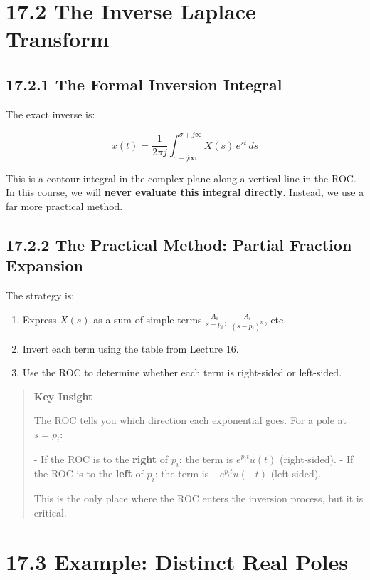 \documentclass[11pt]{article}
\begin{document}
\section*{17.2 The Inverse Laplace Transform}

\subsection*{17.2.1 The Formal Inversion Integral}

The exact inverse is:

\[x(t) = \frac{1}{2\pi j} \int_{\sigma-j\infty}^{\sigma+j\infty} X(s)\, e^{st}\, ds\]

This is a contour integral in the complex plane along a vertical line in the ROC. In this course, we will \textbf{never evaluate this integral directly}. Instead, we use a far more practical method.

\subsection*{17.2.2 The Practical Method: Partial Fraction Expansion}

The strategy is:

\begin{enumerate}
  \item Express $X(s)$ as a sum of simple terms $\frac{A_i}{s-p_i}$, $\frac{A_i}{(s-p_i)^n}$, etc.
  \item Invert each term using the table from Lecture 16.
  \item Use the ROC to determine whether each term is right-sided or left-sided.
\end{enumerate}

\begin{quote}
\textbf{Key Insight}

The ROC tells you which direction each exponential goes. For a pole at $s = p_i$:

- If the ROC is to the \textbf{right} of $p_i$: the term is $e^{p_i t} u(t)$ (right-sided).
- If the ROC is to the \textbf{left} of $p_i$: the term is $-e^{p_i t} u(-t)$ (left-sided).

This is the only place where the ROC enters the inversion process, but it is critical.
\end{quote}

\section*{17.3 Example: Distinct Real Poles}
\end{document}
